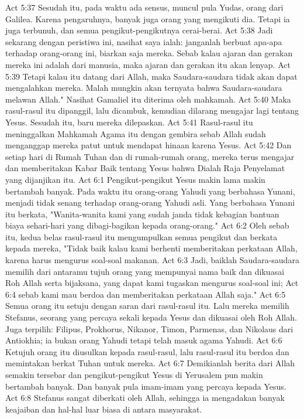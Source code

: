 Act 5:37  Sesudah itu, pada waktu ada sensus, muncul pula Yudas, orang dari Galilea. Karena pengaruhnya, banyak juga orang yang mengikuti dia. Tetapi ia juga terbunuh, dan semua pengikut-pengikutnya cerai-berai.
Act 5:38  Jadi sekarang dengan peristiwa ini, nasihat saya ialah: janganlah berbuat apa-apa terhadap orang-orang ini, biarkan saja mereka. Sebab kalau ajaran dan gerakan mereka ini adalah dari manusia, maka ajaran dan gerakan itu akan lenyap.
Act 5:39  Tetapi kalau itu datang dari Allah, maka Saudara-saudara tidak akan dapat mengalahkan mereka. Malah mungkin akan ternyata bahwa Saudara-saudara melawan Allah." Nasihat Gamaliel itu diterima oleh mahkamah.
Act 5:40  Maka rasul-rasul itu dipanggil, lalu dicambuk, kemudian dilarang mengajar lagi tentang Yesus. Sesudah itu, baru mereka dilepaskan.
Act 5:41  Rasul-rasul itu meninggalkan Mahkamah Agama itu dengan gembira sebab Allah sudah menganggap mereka patut untuk mendapat hinaan karena Yesus.
Act 5:42  Dan setiap hari di Rumah Tuhan dan di rumah-rumah orang, mereka terus mengajar dan memberitakan Kabar Baik tentang Yesus bahwa Dialah Raja Penyelamat yang dijanjikan itu.
Act 6:1  Pengikut-pengikut Yesus makin lama makin bertambah banyak. Pada waktu itu orang-orang Yahudi yang berbahasa Yunani, menjadi tidak senang terhadap orang-orang Yahudi asli. Yang berbahasa Yunani itu berkata, "Wanita-wanita kami yang sudah janda tidak kebagian bantuan biaya sehari-hari yang dibagi-bagikan kepada orang-orang."
Act 6:2  Oleh sebab itu, kedua belas rasul-rasul itu mengumpulkan semua pengikut dan berkata kepada mereka, "Tidak baik kalau kami berhenti memberitakan perkataan Allah, karena harus mengurus soal-soal makanan.
Act 6:3  Jadi, baiklah Saudara-saudara memilih dari antaramu tujuh orang yang mempunyai nama baik dan dikuasai Roh Allah serta bijaksana, yang dapat kami tugaskan mengurus soal-soal ini;
Act 6:4  sebab kami mau berdoa dan memberitakan perkataan Allah saja."
Act 6:5  Semua orang itu setuju dengan saran dari rasul-rasul itu. Lalu mereka memilih Stefanus, seorang yang percaya sekali kepada Yesus dan dikuasai oleh Roh Allah. Juga terpilih: Filipus, Prokhorus, Nikanor, Timon, Parmenas, dan Nikolaus dari Antiokhia; ia bukan orang Yahudi tetapi telah masuk agama Yahudi.
Act 6:6  Ketujuh orang itu diusulkan kepada rasul-rasul, lalu rasul-rasul itu berdoa dan memintakan berkat Tuhan untuk mereka.
Act 6:7  Demikianlah berita dari Allah semakin tersebar dan pengikut-pengikut Yesus di Yerusalem pun makin bertambah banyak. Dan banyak pula imam-imam yang percaya kepada Yesus.
Act 6:8  Stefanus sangat diberkati oleh Allah, sehingga ia mengadakan banyak keajaiban dan hal-hal luar biasa di antara masyarakat.
